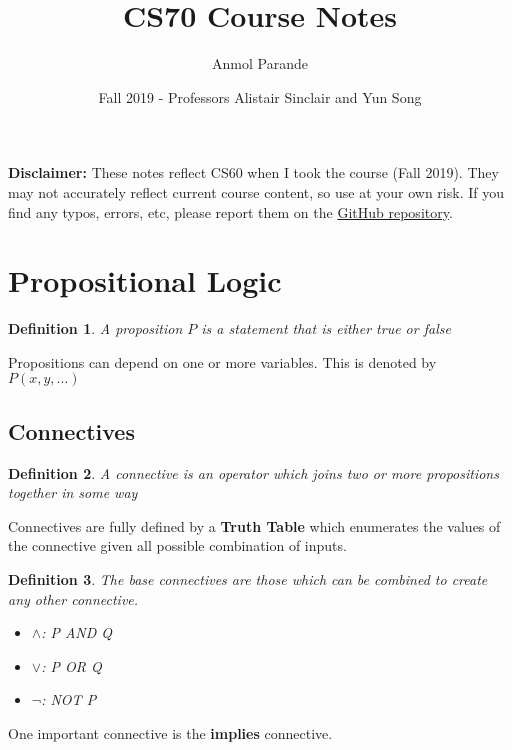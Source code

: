 \documentclass{article}
\newtheorem{definition}{Definition}
\begin{document}
\title{CS70 Course Notes}
\author{Anmol Parande}
\date{Fall 2019 - Professors Alistair Sinclair and Yun Song}
\maketitle
\textbf{Disclaimer: }These notes reflect CS60 when I took the course (Fall 2019). They may not accurately reflect current course content, so use at your own risk.
If you find any typos, errors, etc, please report them on the \href{https://github.com/parandea17/BerkeleyNotes}{GitHub repository}.\\
\tableofcontents
\newpage
\section{Propositional Logic}
\begin{definition}
    A proposition $P$ is a statement that is either true or false
\end{definition}
Propositions can depend on one or more variables. This is denoted by $P(x, y, ...)$
\subsection{Connectives}
\begin{definition}
    A connective is an operator which joins two or more propositions together in some way
\end{definition}
Connectives are fully defined by a \textbf{Truth Table} which enumerates the values of the connective
given all possible combination of inputs.
\begin{definition}
    The base connectives are those which can be combined to create any other connective.
    \begin{itemize}
        \item $\land$: P AND Q
        \item $\lor$: P OR Q
        \item $\lnot$: NOT P
    \end{itemize}
\end{definition}
One important connective is the \textbf{implies} connective.
\end{document}
